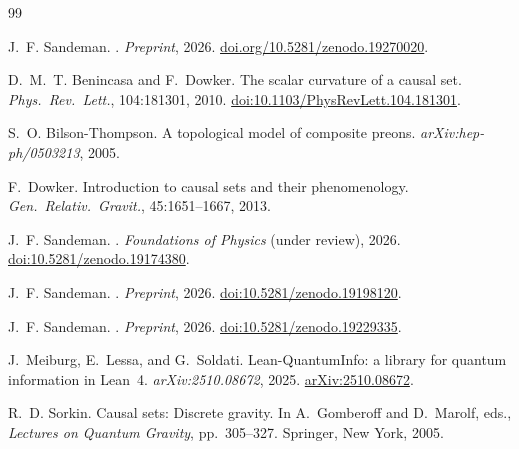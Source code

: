 \documentclass[11pt,a4paper]{article}
\begin{document}
\begin{thebibliography}{99}

J.~F. Sandeman.
.
\newblock \textit{Preprint}, 2026.
\newblock \href{https://doi.org/10.5281/zenodo.19270020}{doi.org/10.5281/zenodo.19270020}.


D.~M.~T. Benincasa and F.~Dowker.
\newblock The scalar curvature of a causal set.
\newblock \textit{Phys.\ Rev.\ Lett.}, 104:181301, 2010.
\newblock \href{https://doi.org/10.1103/PhysRevLett.104.181301}{doi:10.1103/PhysRevLett.104.181301}.

S.~O. Bilson-Thompson.
\newblock A topological model of composite preons.
\newblock \textit{arXiv:hep-ph/0503213}, 2005.

F.~Dowker.
\newblock Introduction to causal sets and their phenomenology.
\newblock \textit{Gen.\ Relativ.\ Gravit.}, 45:1651--1667, 2013.

J.~F. Sandeman.
.
\newblock \textit{Foundations of Physics} (under review), 2026.
\newblock \href{https://doi.org/10.5281/zenodo.19174380}{doi:10.5281/zenodo.19174380}.

J.~F. Sandeman.
.
\newblock \textit{Preprint}, 2026.
\newblock \href{https://doi.org/10.5281/zenodo.19198120}{doi:10.5281/zenodo.19198120}.

J.~F. Sandeman.
.
\newblock \textit{Preprint}, 2026.
\newblock \href{https://doi.org/10.5281/zenodo.19229335}{doi:10.5281/zenodo.19229335}.

J.~Meiburg, E.~Lessa, and G.~Soldati.
\newblock Lean-QuantumInfo: a library for quantum information in Lean~4.
\newblock \textit{arXiv:2510.08672}, 2025.
\newblock \href{https://arxiv.org/abs/2510.08672}{arXiv:2510.08672}.

R.~D. Sorkin.
\newblock Causal sets: Discrete gravity.
\newblock In A.~Gomberoff and D.~Marolf, eds., \textit{Lectures on Quantum Gravity},
pp.\ 305--327. Springer, New York, 2005.

\end{thebibliography}
\end{document}
